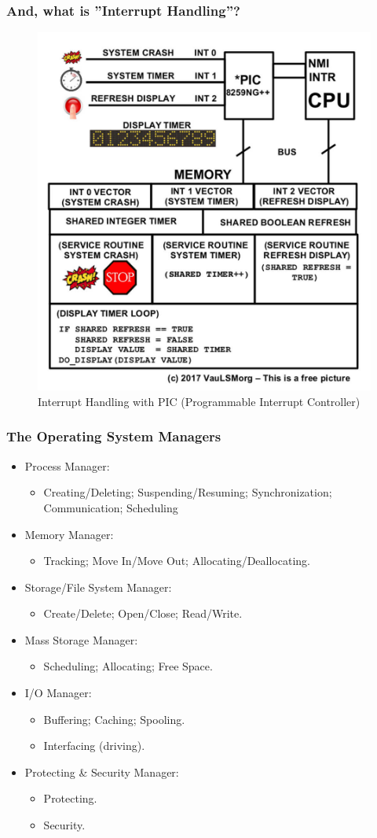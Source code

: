 \documentclass[xcolor=table, notheorems, hyperref={pdfpagelabels=false}]{beamer}
\begin{document}
\begin{frame}
\frametitle{And, what is ''Interrupt Handling''?}
\begin{figure}
\includegraphics[width=0.56\linewidth]{os00-int-protection}
\caption{Interrupt Handling with PIC (Programmable Interrupt Controller)}
\end{figure}
\end{frame}

\begin{frame}
\frametitle{The Operating System Managers}
\begin{itemize}
\item Process Manager: 
\begin{itemize}
\item Creating/Deleting; Suspending/Resuming; Synchronization; Communication; Scheduling
\end{itemize}
\item Memory Manager:
\begin{itemize}
\item Tracking; Move In/Move Out; Allocating/Deallocating.
\end{itemize}
\item Storage/File System Manager:
\begin{itemize}
\item Create/Delete; Open/Close; Read/Write.
\end{itemize}
\item Mass Storage Manager:
\begin{itemize}
\item Scheduling; Allocating; Free Space.
\end{itemize}
\item I/O Manager:
\begin{itemize}
\item Buffering; Caching; Spooling.
\item Interfacing (driving).
\end{itemize}
\item Protecting \& Security Manager:
\begin{itemize}
\item Protecting.
\item Security.
\end{itemize}
\end{itemize}
\end{frame}
\end{document}
